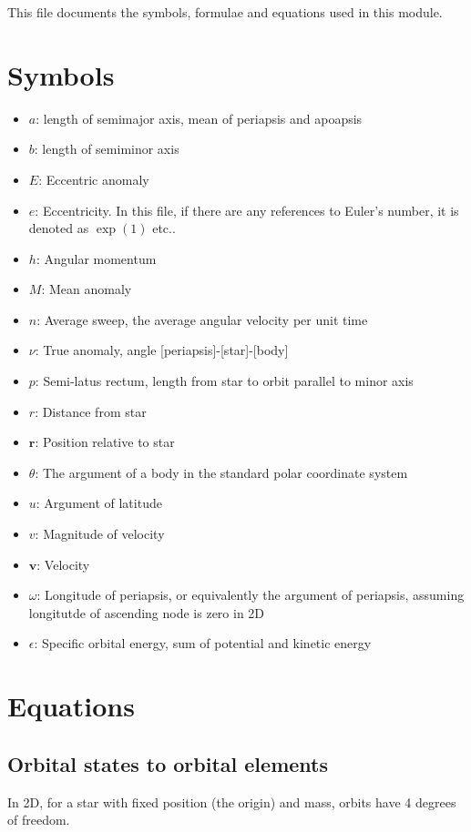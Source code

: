 \documentclass{article}
\begin{document}
This file documents the symbols, formulae and equations used in this module.

\section{Symbols}

\begin{itemize}
	\item $a$: length of semimajor axis, mean of periapsis and apoapsis
	\item $b$: length of semiminor axis
	\item $E$: Eccentric anomaly
	\item $e$: Eccentricity. In this file, if there are any references to Euler's number, it is denoted as $\operatorname{exp}(1)$ etc..
	\item $h$: Angular momentum
	\item $M$: Mean anomaly
	\item $n$: Average sweep, the average angular velocity per unit time
	\item $\nu$: True anomaly, angle [periapsis]-[star]-[body]
	\item $p$: Semi-latus rectum, length from star to orbit parallel to minor axis
	\item $r$: Distance from star
	\item $\mathbf r$: Position relative to star
	\item $\theta$: The argument of a body in the standard polar coordinate system
	\item $u$: Argument of latitude
	\item $v$: Magnitude of velocity
	\item $\mathbf v$: Velocity
	\item $\omega$: Longitude of periapsis, or equivalently the argument of periapsis, assuming longitutde of ascending node is zero in 2D
	\item $\epsilon$: Specific orbital energy, sum of potential and kinetic energy
\end{itemize}

\section{Equations}
\subsection{Orbital states to orbital elements}
In 2D, for a star with fixed position (the origin) and mass, orbits have 4 degrees of freedom.
\end{document}
